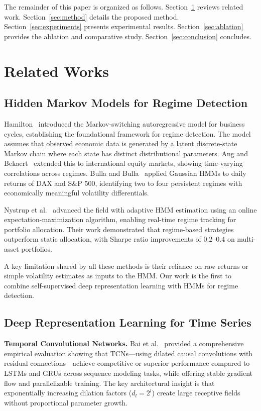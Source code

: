 \documentclass[conference, twocolumn]{IEEEtran}
\begin{document}
The remainder of this paper is organized as follows. Section~\ref{sec:related} reviews related work. Section~\ref{sec:method} details the proposed method. Section~\ref{sec:experiments} presents experimental results. Section~\ref{sec:ablation} provides the ablation and comparative study. Section~\ref{sec:conclusion} concludes.

\section{Related Works}
\label{sec:related}

\subsection{Hidden Markov Models for Regime Detection}

Hamilton~\cite{hamilton1989} introduced the Markov-switching autoregressive model for business cycles, establishing the foundational framework for regime detection. The model assumes that observed economic data is generated by a latent discrete-state Markov chain where each state has distinct distributional parameters. Ang and Bekaert~\cite{ang2002} extended this to international equity markets, showing time-varying correlations across regimes. Bulla and Bulla~\cite{bulla2006} applied Gaussian HMMs to daily returns of DAX and S\&P 500, identifying two to four persistent regimes with economically meaningful volatility differentials.

Nystrup et al.~\cite{nystrup2017} advanced the field with adaptive HMM estimation using an online expectation-maximization algorithm, enabling real-time regime tracking for portfolio allocation. Their work demonstrated that regime-based strategies outperform static allocation, with Sharpe ratio improvements of 0.2--0.4 on multi-asset portfolios.

A key limitation shared by all these methods is their reliance on raw returns or simple volatility estimates as inputs to the HMM. Our work is the first to combine self-supervised deep representation learning with HMMs for regime detection.

\subsection{Deep Representation Learning for Time Series}

\textbf{Temporal Convolutional Networks.} Bai et al.~\cite{bai2018} provided a comprehensive empirical evaluation showing that TCNs---using dilated causal convolutions with residual connections---achieve competitive or superior performance compared to LSTMs and GRUs across sequence modeling tasks, while offering stable gradient flow and parallelizable training. The key architectural insight is that exponentially increasing dilation factors ($d_l = 2^l$) create large receptive fields without proportional parameter growth.
\end{document}
